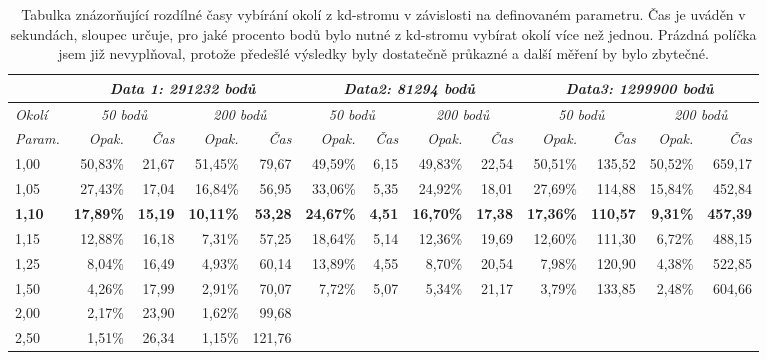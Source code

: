 \documentclass[11pt,twoside,a4paper]{book}
\begin{document}
\begin{table}[ht]
\resizebox{\textwidth}{!} {
\begin{tabular}{|l|r|r|r|r|r|r|r|r|r|r|r|r|}
\hline
\textit{} & \multicolumn{ 4}{c|}{\textit{Data 1: 291232 bodů}} & \multicolumn{ 4}{c|}{\textit{Data2: 81294 bodů}} & \multicolumn{ 4}{c|}{\textit{Data3: 1299900 bodů}} \\ \hline
\textit{Okolí} & \multicolumn{ 2}{c|}{\textit{50 bodů}} & \multicolumn{ 2}{c|}{\textit{200 bodů}} & \multicolumn{ 2}{c|}{\textit{50 bodů}} & \multicolumn{ 2}{c|}{\textit{200 bodů}} & \multicolumn{ 2}{c|}{\textit{50 bodů}} & \multicolumn{ 2}{c|}{\textit{200 bodů}} \\ \hline
\textit{Param.} & \textit{Opak.} & \textit{Čas} & \textit{Opak.} & \textit{Čas} & \textit{Opak.} & \textit{Čas} & \textit{Opak.} & \textit{Čas} & \textit{Opak.} & \textit{Čas} & \textit{Opak.} & \textit{Čas} \\ \hline
1,00 & 50,83\% & 21,67 & 51,45\% & 79,67 & 49,59\% & 6,15 & 49,83\% & 22,54 & 50,51\% & 135,52 & 50,52\% & 659,17 \\ \hline
1,05 & 27,43\% & 17,04 & 16,84\% & 56,95 & 33,06\% & 5,35 & 24,92\% & 18,01 & 27,69\% & 114,88 & 15,84\% & 452,84 \\ \hline
\textbf{1,10} & \textbf{17,89\%} & \textbf{15,19} & \textbf{10,11\%} & \textbf{53,28} & \textbf{24,67\%} & \textbf{4,51} & \textbf{16,70\%} & \textbf{17,38} & \textbf{17,36\%} & \textbf{110,57} & \textbf{9,31\%} & \textbf{457,39} \\ \hline
1,15 & 12,88\% & 16,18 & 7,31\% & 57,25 & 18,64\% & 5,14 & 12,36\% & 19,69 & 12,60\% & 111,30 & 6,72\% & 488,15 \\ \hline
1,25 & 8,04\% & 16,49 & 4,93\% & 60,14 & 13,89\% & 4,55 & 8,70\% & 20,54 & 7,98\% & 120,90 & 4,38\% & 522,85 \\ \hline
1,50 & 4,26\% & 17,99 & 2,91\% & 70,07 & 7,72\% & 5,07 & 5,34\% & 21,17 & 3,79\% & 133,85 & 2,48\% & 604,66 \\ \hline
2,00 & 2,17\% & 23,90 & 1,62\% & 99,68 & \multicolumn{1}{l|}{} & \multicolumn{1}{l|}{} & \multicolumn{1}{l|}{} & \multicolumn{1}{l|}{} & \multicolumn{1}{l|}{} & \multicolumn{1}{l|}{} & \multicolumn{1}{l|}{} & \multicolumn{1}{l|}{} \\ \hline
2,50 & 1,51\% & 26,34 & 1,15\% & 121,76 & \multicolumn{1}{l|}{} & \multicolumn{1}{l|}{} & \multicolumn{1}{l|}{} & \multicolumn{1}{l|}{} & \multicolumn{1}{l|}{} & \multicolumn{1}{l|}{} & \multicolumn{1}{l|}{} & \multicolumn{1}{l|}{} \\ \hline
\end{tabular}
}
\caption{Tabulka znázorňující rozdílné časy vybírání okolí z kd-stromu v závislosti na definovaném parametru. Čas je uváděn v sekundách, sloupec  určuje, pro jaké procento bodů bylo nutné z kd-stromu vybírat okolí více než jednou. Prázdná políčka jsem již nevyplňoval, protože předešlé výsledky byly dostatečně průkazné a další měření by bylo zbytečné.} 
\label{table:okoli-param}
\end{table}
\end{document}
